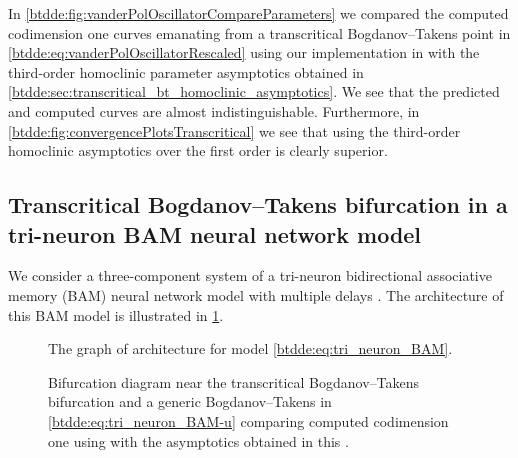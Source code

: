In \cref{btdde:fig:vanderPolOscillatorCompareParameters} we compared the computed
codimension one curves emanating from a transcritical Bogdanov--Takens point in
\cref{btdde:eq:vanderPolOscillatorRescaled} using our implementation in \DDEBIFTOOL
with the third-order homoclinic parameter asymptotics obtained in
\cref{btdde:sec:transcritical_bt_homoclinic_asymptotics}. We see that the predicted
and computed curves are almost indistinguishable. Furthermore, in
\cref{btdde:fig:convergencePlotsTranscritical} we see that using the third-order
homoclinic asymptotics over the first order is clearly superior.

\subsection{Transcritical Bogdanov--Takens bifurcation in a tri-neuron BAM neural network model}
\label{btdde:sec:Tri-neuron-BAM-neural}

We consider a three-component system of a tri-neuron bidirectional
associative memory (BAM) neural network model with multiple delays \cite{dong2013bogdanov}.
The architecture of this BAM model is illustrated in \cref{btdde:fig:BAM_architecture_graph}. 

\begin{figure}
\centering
{}
\caption{The graph of architecture for model \cref{btdde:eq:tri_neuron_BAM}.}
\label{btdde:fig:BAM_architecture_graph}
\end{figure}

\begin{figure}[ht]
\centering
{}
\caption{
Bifurcation diagram near the transcritical Bogdanov--Takens bifurcation and
a generic Bogdanov--Takens in \cref{btdde:eq:tri_neuron_BAM-u} comparing computed
codimension one using \DDEBIFTOOL with the asymptotics obtained in this
\paper{}.}
\label{btdde:fig:triNeuronBAMNeuralNetworkModelCompareParameters}
\end{figure}

